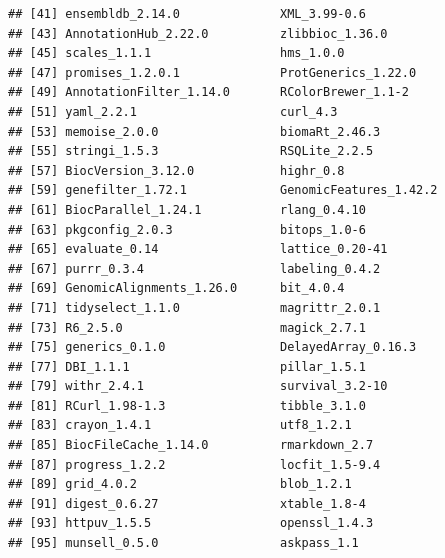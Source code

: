 \documentclass[]{article}
\begin{document}
\begin{verbatim}
## [41] ensembldb_2.14.0              XML_3.99-0.6                 
## [43] AnnotationHub_2.22.0          zlibbioc_1.36.0              
## [45] scales_1.1.1                  hms_1.0.0                    
## [47] promises_1.2.0.1              ProtGenerics_1.22.0          
## [49] AnnotationFilter_1.14.0       RColorBrewer_1.1-2           
## [51] yaml_2.2.1                    curl_4.3                     
## [53] memoise_2.0.0                 biomaRt_2.46.3               
## [55] stringi_1.5.3                 RSQLite_2.2.5                
## [57] BiocVersion_3.12.0            highr_0.8                    
## [59] genefilter_1.72.1             GenomicFeatures_1.42.2       
## [61] BiocParallel_1.24.1           rlang_0.4.10                 
## [63] pkgconfig_2.0.3               bitops_1.0-6                 
## [65] evaluate_0.14                 lattice_0.20-41              
## [67] purrr_0.3.4                   labeling_0.4.2               
## [69] GenomicAlignments_1.26.0      bit_4.0.4                    
## [71] tidyselect_1.1.0              magrittr_2.0.1               
## [73] R6_2.5.0                      magick_2.7.1                 
## [75] generics_0.1.0                DelayedArray_0.16.3          
## [77] DBI_1.1.1                     pillar_1.5.1                 
## [79] withr_2.4.1                   survival_3.2-10              
## [81] RCurl_1.98-1.3                tibble_3.1.0                 
## [83] crayon_1.4.1                  utf8_1.2.1                   
## [85] BiocFileCache_1.14.0          rmarkdown_2.7                
## [87] progress_1.2.2                locfit_1.5-9.4               
## [89] grid_4.0.2                    blob_1.2.1                   
## [91] digest_0.6.27                 xtable_1.8-4                 
## [93] httpuv_1.5.5                  openssl_1.4.3                
## [95] munsell_0.5.0                 askpass_1.1
\end{verbatim}
\end{document}
